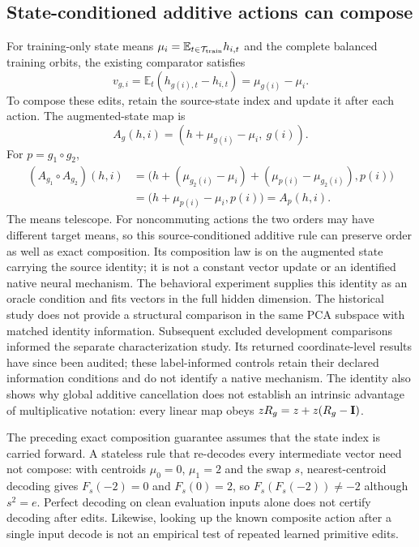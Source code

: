 \subsection{State-conditioned additive actions can compose}
\label{app:additive-composition}
For training-only state means $\mu_i=\mathbb{E}_{t\in\mathcal T_{\rm train}}h_{i,t}$ and the complete balanced training orbits, the existing comparator satisfies
\[
 v_{g,i}=\mathbb{E}_t(h_{g(i),t}-h_{i,t})=\mu_{g(i)}-\mu_i.
\]
To compose these edits, retain the source-state index and update it after each action. The augmented-state map is
\[
 A_g(h,i)=(h+\mu_{g(i)}-\mu_i,\ g(i)).
\]
For $p=g_1\circ g_2$,
\begin{align*}
 (A_{g_1}\circ A_{g_2})(h,i)
 &=\bigl(h+(\mu_{g_2(i)}-\mu_i)
             +(\mu_{p(i)}-\mu_{g_2(i)}),p(i)\bigr)\\
 &=\bigl(h+\mu_{p(i)}-\mu_i,p(i)\bigr)=A_p(h,i).
\end{align*}
The means telescope. For noncommuting actions the two orders may have different target means, so this source-conditioned additive rule can preserve order as well as exact composition. Its composition law is on the augmented state carrying the source identity; it is not a constant vector update or an identified native neural mechanism. The behavioral experiment supplies this identity as an oracle condition and fits vectors in the full hidden dimension. The historical study does not provide a structural comparison in the same PCA subspace with matched identity information. Subsequent excluded development comparisons informed the separate characterization study. Its returned coordinate-level results have since been audited; these label-informed controls retain their declared information conditions and do not identify a native mechanism. The identity also shows why global additive cancellation does not establish an intrinsic advantage of multiplicative notation: every linear map obeys $zR_g=z+z(R_g-\mathbf{I})$.

The preceding exact composition guarantee assumes that the state index is carried forward. A stateless rule that re-decodes every intermediate vector need not compose: with centroids $\mu_0=0$, $\mu_1=2$ and the swap $s$, nearest-centroid decoding gives $F_s(-2)=0$ and $F_s(0)=2$, so $F_s(F_s(-2))\ne-2$ although $s^2=e$. Perfect decoding on clean evaluation inputs alone does not certify decoding after edits. Likewise, looking up the known composite action after a single input decode is not an empirical test of repeated learned primitive edits.

